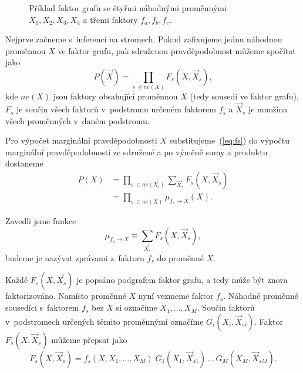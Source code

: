 \begin{figure}[H]
\begin{center}
\end{center}
\caption{Příklad faktor grafu se čtyřmi náhodnými proměnnými $X_1, X_2, X_3, X_4$ a třemi faktory $f_a, f_b, f_c$.}
\end{figure}

Nejprve začneme s~inferencí na stromech.
Pokud zafixujeme jednu náhodnou proměnnou $X$ ve faktor grafu, pak sdruženou pravděpodobnost můžeme spočítat jako
\begin{equation}
    P(\vec{X}) = \prod_{s~\in ne(X)} F_s(X, \vec{X}_s),
\label{eq:fs}
\end{equation}
kde $ne(X)$ jsou faktory obsahující proměnnou $X$ (tedy sousedi ve faktor grafu), $F_s$ je součin všech faktorů v~podstromu určeném faktorem $f_s$ a $\vec{X}_s$ je množina všech proměnných v~daném podstromu.

Pro výpočet marginální pravděpodobnosti $X$ substitujeme~(\ref{eq:fs}) do výpočtu marginální pravděpodobnosti ze sdružené a po výměně sumy a produktu dostaneme
\begin{align}
P(X) &= \prod_{s~\in ne(X_i)} \sum_{\vec{X}_s} F_s(X, \vec{X}_s)
\\
&= \prod_{s~\in ne(X)} \mu_{f_s \rightarrow X}(X).
\label{eq:margx}
\end{align}

Zavedli jsme funkce
\begin{equation}
    \mu_{f_s \rightarrow X} \equiv \sum_{\vec{X}_s} F_s(X, \vec{X}_s),
\label{eq:defmsgfx}
\end{equation}
budeme je nazývat zprávami z~faktoru $f_s$ do proměnné $X$.

Každé $F_s(X, \vec{X}_s)$ je popsáno podgrafem faktor grafu, a tedy může být znova faktorizováno.
Namísto proměnné $X$ nyní vezmeme faktor $f_s$.
Náhodné proměnné sousedící s~faktorem $f_s$ bez $X$ si označíme $X_1, \dots, X_M$.
Součin faktorů v~podstromech určených těmito proměnnými označíme $G_i(X_i, \vec{X}_{si})$.
Faktor $F_s(X, \vec{X}_s)$ můžeme přepsat jako
\begin{equation}
F_s(X, \vec{X}_s) = f_s(X, X_1, \dots, X_M) \; G_1(X_1, \vec{X}_{s1}) \,\dots\, G_M(X_M, \vec{X}_{sM}).
\end{equation}

